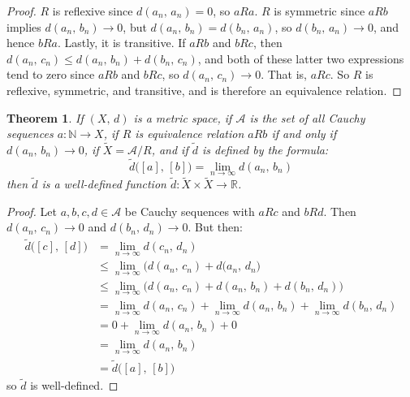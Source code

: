 \documentclass{article}
\theoremstyle{plain}
\newtheorem{theorem}{Theorem}
\theoremstyle{normal}
\begin{document}
    \begin{proof}
        $R$ is reflexive since $d(a_{n},\,a_{n})=0$, so $aRa$. $R$ is
        symmetric since $aRb$ implies $d(a_{n},\,b_{n})\rightarrow{0}$,
        but $d(a_{n},\,b_{n})=d(b_{n},\,a_{n})$, so
        $d(b_{n},\,a_{n})\rightarrow{0}$, and hence $bRa$. Lastly, it is
        transitive. If $aRb$ and $bRc$, then
        $d(a_{n},\,c_{n})\leq{d}(a_{n},\,b_{n})+d(b_{n},\,c_{n})$, and both of
        these latter two expressions tend to zero since $aRb$ and $bRc$, so
        $d(a_{n},\,c_{n})\rightarrow{0}$. That is, $aRc$. So $R$ is
        reflexive, symmetric, and transitive, and is therefore an
        equivalence relation.
    \end{proof}
    \begin{theorem}
        If $(X,\,d)$ is a metric space, if $\mathcal{A}$ is the set of all
        Cauchy sequences $a:\mathbb{N}\rightarrow{X}$, if
        $R$ is equivalence relation $aRb$ if and only if
        $d(a_{n},\,b_{n})\rightarrow{0}$, if $\tilde{X}=\mathcal{A}/R$, and
        if $\tilde{d}$ is defined by the formula:
        \begin{equation}
            \tilde{d}\big([a],\,[b]\big)=\lim_{n\rightarrow{\infty}}
                d(a_{n},\,b_{n})
        \end{equation}
        then $\tilde{d}$ is a well-defined function
        $\tilde{d}:\tilde{X}\times\tilde{X}\rightarrow\mathbb{R}$.
    \end{theorem}
    \begin{proof}
        Let $a,b,c,d\in\mathcal{A}$ be Cauchy sequences with
        $aRc$ and $bRd$. Then $d(a_{n},\,c_{n})\rightarrow{0}$ and
        $d(b_{n},\,d_{n})\rightarrow{0}$. But then:
        \begin{align}
            \tilde{d}\big([c],\,[d]\big)
            &=\lim_{n\rightarrow\infty}d(c_{n},\,d_{n})\\
            &\leq\lim_{n\rightarrow\infty}\big(d(a_{n},\,c_{n})
                +d(a_{n},\,d_{n}\big)\\
            &\leq\lim_{n\rightarrow\infty}\big(
                d(a_{n},\,c_{n})+d(a_{n},\,b_{n})+d(b_{n},\,d_{n})\big)\\
            &=\lim_{n\rightarrow\infty}d(a_{n},\,c_{n})+
                \lim_{n\rightarrow\infty}d(a_{n},\,b_{n})+
                \lim_{n\rightarrow\infty}d(b_{n},\,d_{n})\\
            &=0+\lim_{n\rightarrow\infty}d(a_{n},\,b_{n})+0\\
            &=\lim_{n\rightarrow\infty}d(a_{n},\,b_{n})\\
            &=\tilde{d}\big([a],\,[b]\big)
        \end{align}
        so $\tilde{d}$ is well-defined.
    \end{proof}
\end{document}
